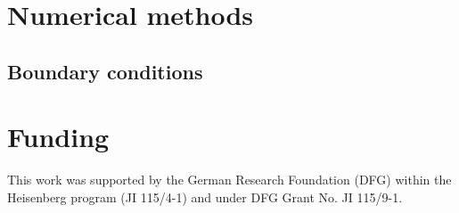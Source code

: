 \documentclass[journal]{IEEEtran}
\begin{document}
\section{Numerical methods}
\subsection{Boundary conditions}

\section*{Funding}
This work was supported by the German Research Foundation (DFG) within the Heisenberg program (JI 115/4-1) and under DFG Grant No. JI 115/9-1.




	
\end{document}
